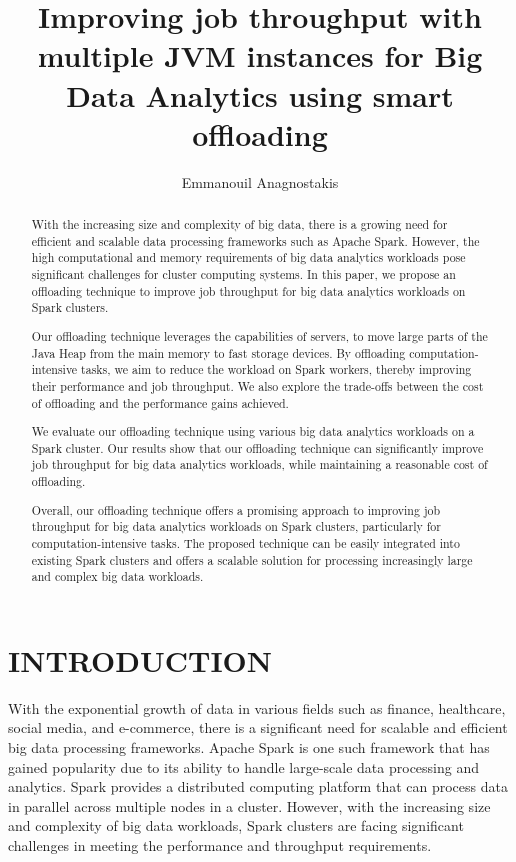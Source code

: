 \documentclass[twocolumn,10pt]{asme2e}
\title{Improving job throughput with multiple JVM instances for Big Data Analytics using smart offloading}
\author{Emmanouil Anagnostakis
    \affiliation{
	MSc Student\\
	Department of Computer Science\\
	University of Crete\\
    Email: manosanag@csd.uoc.gr
    }	
}
\begin{document}
\maketitle    

\begin{abstract}
{
With the increasing size and complexity of big data, there is a growing need for efficient and scalable data processing frameworks such as Apache Spark. However, the high computational and memory requirements of big data analytics workloads pose significant challenges for cluster computing systems. In this paper, we propose an offloading technique to improve job throughput for big data analytics workloads on Spark clusters.

Our offloading technique leverages the capabilities of servers, to move large parts of the Java Heap from the main memory to fast storage devices. By offloading computation-intensive tasks, we aim to reduce the workload on Spark workers, thereby improving their performance and job throughput. We also explore the trade-offs between the cost of offloading and the performance gains achieved.

We evaluate our offloading technique using various big data analytics workloads on a Spark cluster. Our results show that our offloading technique can significantly improve job throughput for big data analytics workloads, while maintaining a reasonable cost of offloading.

Overall, our offloading technique offers a promising approach to improving job throughput for big data analytics workloads on Spark clusters, particularly for computation-intensive tasks. The proposed technique can be easily integrated into existing Spark clusters and offers a scalable solution for processing increasingly large and complex big data workloads.
}
\end{abstract}

\section*{INTRODUCTION}

With the exponential growth of data in various fields such as finance, healthcare, social media, and e-commerce, there is a significant need for scalable and efficient big data processing frameworks. Apache Spark is one such framework that has gained popularity due to its ability to handle large-scale data processing and analytics. Spark provides a distributed computing platform that can process data in parallel across multiple nodes in a cluster. However, with the increasing size and complexity of big data workloads, Spark clusters are facing significant challenges in meeting the performance and throughput requirements.
\end{document}
